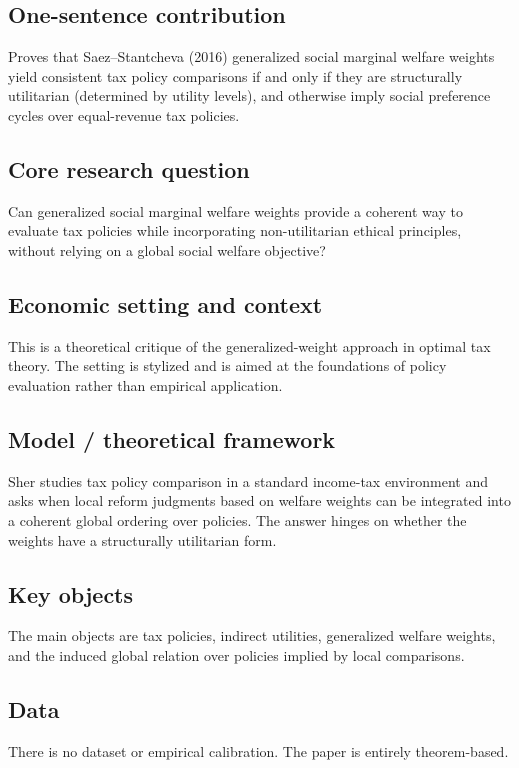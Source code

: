 \documentclass[11pt,a4paper]{article}
\begin{document}
\subsection*{One-sentence contribution}
Proves that Saez--Stantcheva (2016) generalized social marginal welfare weights yield consistent tax policy comparisons if and only if they are structurally utilitarian (determined by utility levels), and otherwise imply social preference cycles over equal-revenue tax policies.

\subsection*{Core research question}
Can generalized social marginal welfare weights provide a coherent way to evaluate tax policies while incorporating non-utilitarian ethical principles, without relying on a global social welfare objective?

\subsection*{Economic setting and context}
This is a theoretical critique of the generalized-weight approach in optimal tax theory. The setting is stylized and is aimed at the foundations of policy evaluation rather than empirical application.

\subsection*{Model / theoretical framework}
Sher studies tax policy comparison in a standard income-tax environment and asks when local reform judgments based on welfare weights can be integrated into a coherent global ordering over policies. The answer hinges on whether the weights have a structurally utilitarian form.

\subsection*{Key objects}
The main objects are tax policies, indirect utilities, generalized welfare weights, and the induced global relation over policies implied by local comparisons.

\subsection*{Data}
There is no dataset or empirical calibration. The paper is entirely theorem-based.
\end{document}
